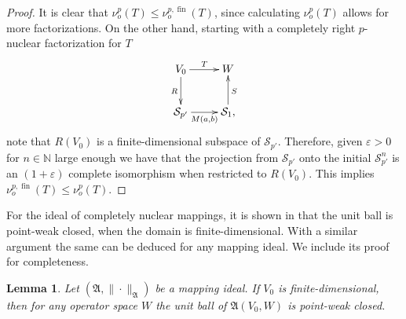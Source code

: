 \documentclass[11pt]{amsart}
\DeclareMathOperator{\fin}{fin}
\newcommand{\N}{{\mathbb{N}}}
\newtheorem{lemma}[theorem]{Lemma}
\numberwithin{equation}{section}
\begin{document}
\begin{proof}
It is clear that $\nu^p_o(T) \le \nu^{p,\fin}_o(T)$, since calculating $\nu^p_o(T)$ allows for more factorizations. On the other hand, starting with a completely right $p$-nuclear factorization for $T$
\[
\xymatrix{
V_0 \ar[r]^T \ar[d]_{R} &W \\
\mathcal{S}_{p'} \ar[r]_{M(a,b)} &\mathcal{S}_1 \ar[u]_{S},
}
\]
note that $R(V_0)$ is a finite-dimensional subspace of $\mathcal{S}_{p'}$. Therefore, given $\varepsilon>0$ for $n \in \N$ large enough we have that the projection from $\mathcal{S}_{p'}$ onto the initial $\mathcal{S}^n_{p'}$
 is an $(1+\varepsilon)$ complete isomorphism when restricted to $R(V_0)$.
 This implies $\nu^{p,\fin}_o(T) \le \nu^p_o(T)$.
\end{proof}


For the  ideal of completely nuclear mappings, it is shown in  \cite[Lem. 12.2.7]{Effros-Ruan-book} that the unit ball is point-weak closed, when the domain is finite-dimensional.
With a similar argument the same can be deduced for any mapping ideal.   We include its proof for completeness.

\begin{lemma}\label{lemma-ball-is-point-weak-closed}
Let $(\mathfrak{A},\|\cdot\|_{\mathfrak{A}})$ be a mapping ideal. If $V_0$  is finite-dimensional, then for any operator space $W$ the unit ball of $\mathfrak{A}(V_0,W)$ is point-weak closed.    
\end{lemma}
\end{document}
